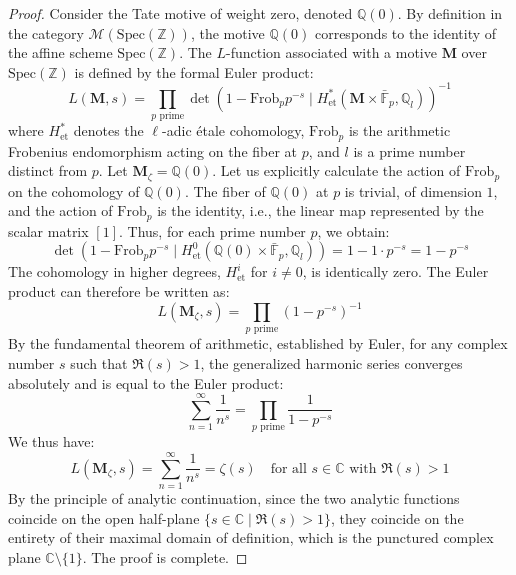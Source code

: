 \documentclass[
]{article}
\begin{document}
\begin{proof}
Consider the Tate motive of weight zero, denoted
\(\mathbb{Q}(0)\). By definition in the category
\(\mathcal{M}(\mathrm{Spec}(\mathbb{Z}))\), the motive \(\mathbb{Q}(0)\)
corresponds to the identity of the affine scheme
\(\mathrm{Spec}(\mathbb{Z})\). The \(L\)-function associated with a
motive \(\mathbf{M}\) over \(\mathrm{Spec}(\mathbb{Z})\) is defined by
the formal Euler product:
\begin{equation*}
L(\mathbf{M}, s) = \prod_{p \text{ prime}} \det\left(1 - \mathrm{Frob}_p p^{-s} \mid H^*_{\text{et}}(\mathbf{M} \times \bar{\mathbb{F}}_p, \mathbb{Q}_l)\right)^{-1}
\end{equation*}
where \(H^*_{\text{et}}\) denotes the \(\ell\)-adic étale cohomology,
\(\mathrm{Frob}_p\) is the arithmetic Frobenius endomorphism acting on
the fiber at \(p\), and \(l\) is a prime number distinct from \(p\). Let
\(\mathbf{M}_{\zeta} = \mathbb{Q}(0)\). Let us explicitly calculate the
action of \(\mathrm{Frob}_p\) on the cohomology of \(\mathbb{Q}(0)\).
The fiber of \(\mathbb{Q}(0)\) at \(p\) is trivial, of dimension \(1\),
and the action of \(\mathrm{Frob}_p\) is the identity, i.e., the linear
map represented by the scalar matrix \([1]\). Thus, for each prime
number \(p\), we obtain:
\begin{equation*}
\det\left(1 - \mathrm{Frob}_p p^{-s} \mid H^0_{\text{et}}(\mathbb{Q}(0) \times \bar{\mathbb{F}}_p, \mathbb{Q}_l)\right) = 1 - 1 \cdot p^{-s} = 1 - p^{-s}
\end{equation*}
The cohomology in higher degrees, \(H^i_{\text{et}}\) for \(i \neq 0\),
is identically zero. The Euler product can therefore be written as:
\begin{equation*}
L(\mathbf{M}_{\zeta}, s) = \prod_{p \text{ prime}} (1 - p^{-s})^{-1}
\end{equation*}
By the fundamental theorem of arithmetic, established by Euler, for any
complex number \(s\) such that \(\Re(s) > 1\), the generalized harmonic
series converges absolutely and is equal to the Euler product:
\begin{equation*}
\sum_{n=1}^{\infty} \frac{1}{n^s} = \prod_{p \text{ prime}} \frac{1}{1 - p^{-s}}
\end{equation*}
We thus have:
\begin{equation*}
L(\mathbf{M}_{\zeta}, s) = \sum_{n=1}^{\infty} \frac{1}{n^s} = \zeta(s) \quad \text{for all } s \in \mathbb{C} \text{ with } \Re(s) > 1
\end{equation*}
By the principle of
analytic continuation, since the two analytic functions coincide on the
open half-plane \(\{s \in \mathbb{C} \mid \Re(s) > 1\}\), they coincide
on the entirety of their maximal domain of definition, which is the
punctured complex plane \(\mathbb{C} \setminus \{1\}\). The proof is
complete.
\end{proof}
\end{document}
